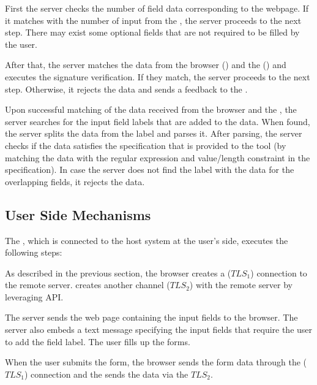 \begin{mylist}
  \item First the server checks the number of field data corresponding to the webpage. If it matches with the number of input from the \device, the server proceeds to the next step. There may exist some optional fields that are not required to be filled by the user.
   \item After that, the server matches the data from the browser (\https) and the \device (\tls) and executes the signature verification. If they match, the server proceeds to the next step. Otherwise, it rejects the data and sends a feedback to the \device.
  \item Upon successful matching of the data received from the browser and the \device, the server searches for the input field labels that are added to the data. When found, the server splits the data from the label and parses it. After parsing, the server checks if the data satisfies the specification that is provided to the \tool tool (by matching the data with the regular expression and value/length constraint in the specification). In case the server does not find the label with the data for the overlapping fields, it rejects the data.
\end{mylist}


\subsection{User Side Mechanisms}
\label{sec:fieldSwap:userSide} 

The \device, which is connected to the host system at the user's side, executes the following steps:
\begin{mylist}
  \item As described in the previous section, the browser creates a \https ($TLS_1$) connection to the remote server. \device creates another \tls channel ($TLS_2$) with the remote server by leveraging \webusb API.
 
  \item The server sends the web page containing the input fields to the browser. The server also embeds a text message specifying the input fields that require the user to add the field label. The user fills up the forms.
  
  \item When the user submits the form, the browser sends the form data through the \https ($TLS_1$) connection and the \device sends the data via the $TLS_2$.
\end{mylist}

